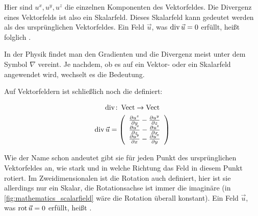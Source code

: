 Hier sind $u^x,u^y,u^z$ die einzelnen Komponenten des Vektorfeldes. Die
Divergenz eines Vektorfelds ist also ein Skalarfeld. Dieses Skalarfeld kann
gedeutet werden als  des ursprünglichen
Vektorfeldes. Ein Feld $\vec{u}$, was $\operatorname*{div} \vec{u}=0$ erfüllt, heißt
folglich .

In der Physik findet man den Gradienten und die Divergenz meist unter dem Symbol
$\nabla$ vereint. Je nachdem, ob es auf ein Vektor- oder ein Skalarfeld
angewendet wird, wechselt es die Bedeutung.

Auf Vektorfeldern ist schließlich noch die  definiert:

\begin{gather}
\operatorname*{div} \colon \operatorname*{Vect} \to \operatorname*{Vect} \\
\operatorname*{div} \vec{u}
=
\left(
	\begin{array}{c}
		\frac{\partial u^z}{\partial y} - \frac{\partial u^y}{\partial z} \\
		\frac{\partial u^x}{\partial z} - \frac{\partial u^z}{\partial x} \\
		\frac{\partial u^y}{\partial x} - \frac{\partial u^x}{\partial y}
	\end{array}
\right)
\end{gather}

Wie der Name schon andeutet gibt sie für jeden Punkt des ursprünglichen
Vektorfeldes an, wie stark und in welche Richtung das Feld in diesem Punkt
rotiert. Im Zweidimensionalen ist die Rotation auch definiert, hier ist sie
allerdings nur ein Skalar, die Rotationsachse ist immer die imaginäre
 (in \autoref{fig:mathematics_scalarfield} wäre die
Rotation überall konstant). Ein Feld $\vec{u}$, was $\operatorname*{rot}
\vec{u}=0$ erfüllt, heißt .

